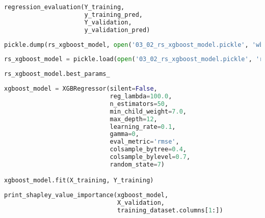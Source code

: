 \begin{lstlisting}[language=Python]
regression_evaluation(Y_training,
                      y_training_pred,
                      Y_validation,
                      y_validation_pred)
\end{lstlisting}

\begin{lstlisting}[language=Python]
pickle.dump(rs_xgboost_model, open('03_02_rs_xgboost_model.pickle', 'wb'))
\end{lstlisting}

\begin{lstlisting}[language=Python]
rs_xgboost_model = pickle.load(open('03_02_rs_xgboost_model.pickle', 'rb'))
\end{lstlisting}

\begin{lstlisting}[language=Python]
rs_xgboost_model.best_params_
\end{lstlisting}

\begin{lstlisting}[language=Python]
xgboost_model = XGBRegressor(silent=False,
                             reg_lambda=100.0,
                             n_estimators=50,
                             min_child_weight=7.0,
                             max_depth=12,
                             learning_rate=0.1,
                             gamma=0,
                             eval_metric='rmse',
                             colsample_bytree=0.4,
                             colsample_bylevel=0.7,
                             random_state=7)

xgboost_model.fit(X_training, Y_training)
\end{lstlisting}

\begin{lstlisting}[language=Python]
print_shapley_value_importance(xgboost_model,
                               X_validation,
                               training_dataset.columns[1:])
\end{lstlisting}
